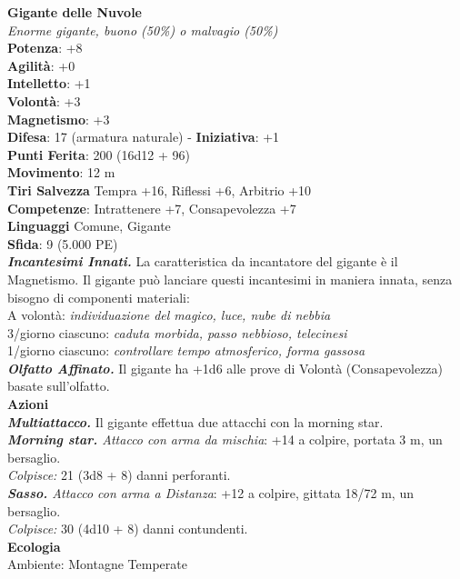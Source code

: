 \begin{multicols}{2}
\medskip\textbf{Gigante delle Nuvole}\\
\emph{Enorme gigante, buono (50\%) o malvagio (50\%)}\\
\textbf{Potenza}: +8 \\
\textbf{Agilità}: +0\\
\textbf{Intelletto}: +1\\
\textbf{Volontà}: +3\\
\textbf{Magnetismo}: +3\\
\textbf{Difesa}: 17 (armatura naturale) - \textbf{Iniziativa}: +1\\
\textbf{Punti Ferita}: 200 (16d12 + 96)\\
\textbf{Movimento}: 12 m\\
\textbf{Tiri Salvezza} Tempra +16, Riflessi +6, Arbitrio +10\\
\textbf{Competenze}: Intrattenere +7, Consapevolezza +7\\
\textbf{Linguaggi} Comune, Gigante\\
\textbf{Sfida}: 9 (5.000 PE)\smallskip\\
\emph{\textbf{Incantesimi Innati.}} La caratteristica da incantatore del gigante è il Magnetismo. Il gigante può lanciare questi incantesimi in maniera innata, senza bisogno di componenti materiali:\\
A volontà: \emph{individuazione del magico, luce, nube di nebbia}\\
3/giorno ciascuno: \emph{caduta morbida, passo nebbioso, telecinesi}\\
1/giorno ciascuno: \emph{controllare tempo atmosferico, forma gassosa}\\
\emph{\textbf{Olfatto Affinato.}} Il gigante ha +1d6 alle prove di Volontà (Consapevolezza) basate sull'olfatto.\\
\smallskip\textbf{Azioni}\\
\emph{\textbf{Multiattacco.}} Il gigante effettua due attacchi con la morning star.\\
\emph{\textbf{Morning star.} Attacco con arma da mischia}: +14 a colpire, portata 3 m, un bersaglio.\\
\emph{Colpisce:} 21 (3d8 + 8) danni perforanti.\\
\emph{\textbf{Sasso.} Attacco con arma a Distanza}: +12 a colpire, gittata 18/72 m, un bersaglio.\\
\emph{Colpisce:} 30 (4d10 + 8) danni contundenti.\\
\textbf{Ecologia}\\
Ambiente: Montagne Temperate\\

\end{multicols}
